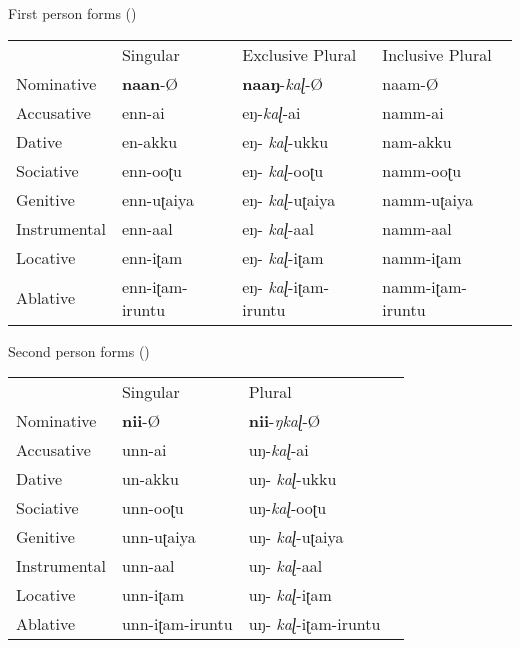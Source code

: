 \documentclass[output=paper,colorlinks,citecolor=brown,
]{langscibook}
\begin{document}
\begin{exe} 
\ex \label{new2}
\begin{xlist}
\ex \label{new2a} First person forms 
(\citet{steever2019dravidian})
\\
\begin{tabular}{llll}
             & Singular        & Exclusive Plural      & Inclusive Plural \\
Nominative   & \textbf{naan}-Ø          & \textbf{naaŋ}-\textit{kaɭ}-Ø            & naam-Ø           \\
Accusative   & enn-ai          & eŋ-\textit{kaɭ}-ai             & namm-ai          \\
Dative       & en-akku         & eŋ-   \textit{kaɭ}-ukku        & nam-akku         \\
Sociative    & enn-ooʈu        & eŋ-   \textit{kaɭ}-ooʈu        & namm-ooʈu        \\
Genitive     & enn-uʈaiya      & eŋ-   \textit{kaɭ}-uʈaiya      & namm-uʈaiya      \\
Instrumental & enn-aal         & eŋ-   \textit{kaɭ}-aal         & namm-aal         \\
Locative     & enn-iʈam        & eŋ-   \textit{kaɭ}-iʈam        & namm-iʈam        \\
Ablative     & enn-iʈam-iruntu & eŋ-   \textit{kaɭ}-iʈam-iruntu & namm-iʈam-iruntu
\end{tabular}

\ex \label{new2a} Second person forms
(\citet{steever2019dravidian})
\\
\begin{tabular}{llll}
             & Singular        & Plural              &  \\
Nominative   & \textbf{nii}-Ø           & \textbf{nii}-\textit{ŋkaɭ}-Ø          &  \\
Accusative   & unn-ai          & uŋ-\textit{kaɭ}-ai           &  \\
Dative       & un-akku         & uŋ- \textit{kaɭ}-ukku        &  \\
Sociative    & unn-ooʈu        & uŋ-\textit{kaɭ}-ooʈu         &  \\
Genitive     & unn-uʈaiya      & uŋ- \textit{kaɭ}-uʈaiya      &  \\
Instrumental & unn-aal         & uŋ- \textit{kaɭ}-aal         &  \\
Locative     & unn-iʈam        & uŋ- \textit{kaɭ}-iʈam        &  \\
Ablative     & unn-iʈam-iruntu & uŋ- \textit{kaɭ}-iʈam-iruntu & 
\end{tabular}


\end{xlist}
\end{exe}
\end{document}
